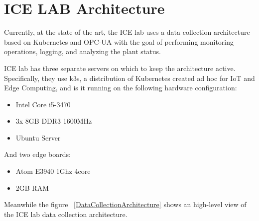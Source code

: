 \documentclass[]{IEEEtran}
\begin{document}
\begin{figure*}[ht]
           
        \caption{A high-level view of the state-of-the-art ICE lab data collection architecture}
         \label{DataCollectionArchitecture}
    \end{figure*}
    
    \section{ICE LAB Architecture}
Currently, at the state of the art, the ICE lab uses a data collection architecture based on Kubernetes and OPC-UA with the goal of performing monitoring operations, logging, and analyzing the plant status.
       
       ICE lab has three separate servers on which to keep the architecture active. Specifically, they use k3s, a distribution of Kubernetes created ad hoc for IoT and Edge Computing, and is it running on the following hardware configuration:
       
       \begin{itemize}
           \item Intel Core i5-3470
           \item 3x 8GB DDR3 1600MHz
           \item Ubuntu Server
           \end{itemize}
           And two edge boards:
                      \begin{itemize}
           \item Atom E3940 1Ghz 4core
           \item 2GB RAM
       \end{itemize}
   
   Meanwhile the figure ~\ref{DataCollectionArchitecture} shows an high-level view of the ICE lab data collection architecture.
   
\end{document}

